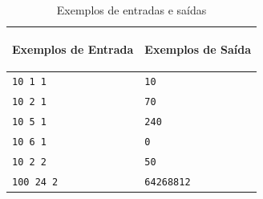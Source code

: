 \begin{table}[h]
    \centering
    \begin{tabular}{|p{7cm}|p{7cm}|}
        \hline
        \begin{center}
            \vspace{-0.3cm}
            \textbf{Exemplos de Entrada}
            \vspace{-0.3cm}
        \end{center} 
         &  
        \begin{center}
            \vspace{-0.3cm}
            \textbf{Exemplos de Saída}
            \vspace{-0.3cm}
        \end{center} \\ \hline
         \texttt{10 1 1} & \texttt{10} \\  
         \hline
         \texttt{10 2 1} & \texttt{70} \\ 
         \hline
         \texttt{10 5 1} & \texttt{240} \\ 
         \hline
         \texttt{10 6 1} & \texttt{0} \\ 
         \hline
         \texttt{10 2 2} & \texttt{50} \\ 
         \hline
         \texttt{100 24 2} & \texttt{64268812} \\ 
         \hline
    \end{tabular}
    \caption{Exemplos de entradas e saídas}
    \label{tab:inputE}
\end{table}

\newpage

\begin{center}
\noindent

\end{center}